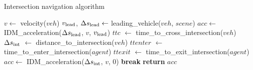  \begin{algorithm}
\caption{Intersection navigation algorithm}
    \label{alg:intersection_navigation}
\begin{algorithmic}[1]
    \footnotesize
    \State $v \gets$ velocity($veh$)
    \State $v_{\rm lead}$, $\Delta s_{\rm lead} \gets$ leading\_vehicle($veh$, $scene$)
    \State $acc \gets$ IDM\_acceleration($\Delta s_{\rm lead}$, $v$, $v_{\rm lead}$) 
        \State $ttc$ $\gets$ time\_to\_cross\_intersection($veh$) 
        \State $\Delta s_{\rm int}$ $\gets$ distance\_to\_intersection($veh$)
            \State $ttenter$ $\gets$ time\_to\_enter\_intersection($agent$) 
            \State $ttexit$ $\gets$ time\_to\_exit\_intersection($agent$) 
                \State $acc \gets$ IDM\_acceleration($\Delta s_{\rm int}$, $v$, 0) 
                \State \textbf{break}
            \EndIf
        \EndFor
        \EndIf
    \EndIf
    \State \textbf{return} $acc$
    \EndFunction
\end{algorithmic}
\end{algorithm}

